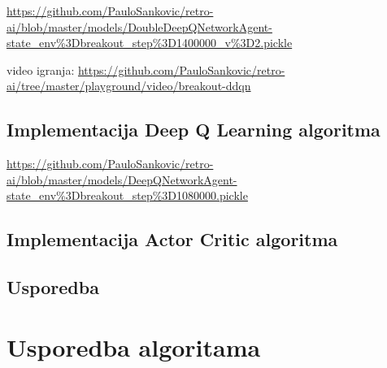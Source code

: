 \url{https://github.com/PauloSankovic/retro-ai/blob/master/models/DoubleDeepQNetworkAgent-state_env\%3Dbreakout_step\%3D1400000_v\%3D2.pickle}

video igranja:
\url{https://github.com/PauloSankovic/retro-ai/tree/master/playground/video/breakout-ddqn}

\subsection{Implementacija Deep Q Learning algoritma}

\url{https://github.com/PauloSankovic/retro-ai/blob/master/models/DeepQNetworkAgent-state_env\%3Dbreakout_step\%3D1080000.pickle}

\subsection{Implementacija Actor Critic algoritma}

\subsection{Usporedba}

\section{Usporedba algoritama}

